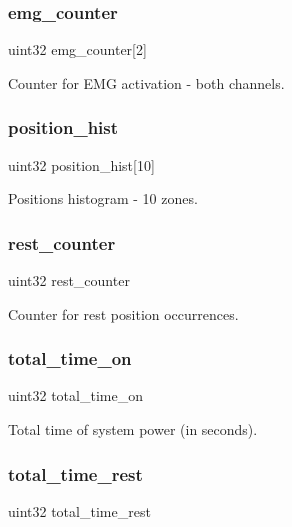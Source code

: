 \subsubsection{emg\+\_\+counter}
{\footnotesize\ttfamily uint32 emg\+\_\+counter[2]}

Counter for E\+MG activation -\/ both channels. \mbox{\label{structst__counters_ab6a7872da6e5008df9709e4d0a57b7ab}} 
\subsubsection{position\+\_\+hist}
{\footnotesize\ttfamily uint32 position\+\_\+hist[10]}

Positions histogram -\/ 10 zones. \mbox{\label{structst__counters_ac3b4a645a1b680f6f03e6efdf9d7a2df}} 
\subsubsection{rest\+\_\+counter}
{\footnotesize\ttfamily uint32 rest\+\_\+counter}

Counter for rest position occurrences. \mbox{\label{structst__counters_afb43d3b7ca83fb698b54d4b6f52d8b45}} 
\subsubsection{total\+\_\+time\+\_\+on}
{\footnotesize\ttfamily uint32 total\+\_\+time\+\_\+on}

Total time of system power (in seconds). \mbox{\label{structst__counters_ace38ca6ca20492e8f6cc0f4684d6dd44}} 
\subsubsection{total\+\_\+time\+\_\+rest}
{\footnotesize\ttfamily uint32 total\+\_\+time\+\_\+rest}

